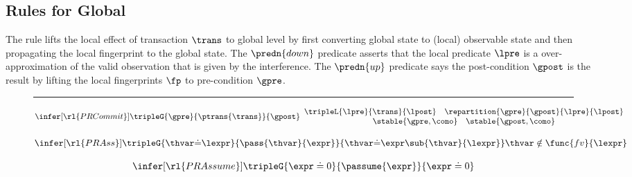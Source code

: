 \subsection{Rules for Global}

The  rule lifts the local effect of transaction \( \trans \) to global level by first converting global state to (local) observable state and then propagating the local fingerprint to the global state.
The \( \predn{down} \) predicate asserts that the local predicate \( \lpre \) is a over-approximation of the valid observation that is given by the interference.
The \( \predn{up} \) predicate says the post-condition \( \gpost \) is the result by lifting the local fingerprints \( \fp \) to pre-condition \( \gpre \).



\begin{figure}[t!]
\hrule\vspace{5pt}


\[
    \infer[\rl{PRCommit}]{%
        \tripleG{\gpre}{ \ptrans{\trans} }{\gpost}
    }{%
        \begin{array}{c}
        \tripleL{\lpre}{\trans}{\lpost} 
        \quad \repartition{\gpre}{\gpost}{\lpre}{\lpost} \\
        \stable{\gpre, \como} 
        \quad \stable{\gpost, \como} 
        \end{array}
    }
\]


\[
    \infer[\rl{PRAss}]{%
        \tripleG{\thvar \dot= \lexpr }{ \pass{\thvar}{\expr} }{\thvar \dot= \expr\sub{\thvar}{\lexpr} }
    }{%
        \thvar \notin \func{fv}{\lexpr} 
    }
\]

\[
    \infer[\rl{PRAssume}]{%
        \tripleG{ \expr \doteq 0 }{ \passume{\expr} }{ \expr \doteq 0 } 
    }{}
\]


\end{figure}
